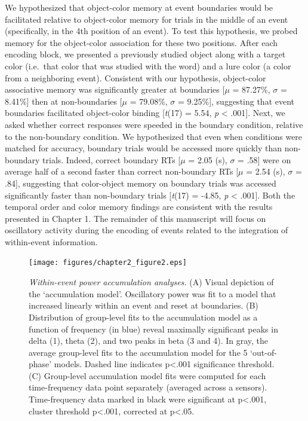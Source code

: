 We hypothesized that object-color memory at event boundaries would be
facilitated relative to object-color memory for trials in the middle of
an event (specifically, in the 4th position of an event). To test this
hypothesis, we probed memory for the object-color association for these
two positions. After each encoding block, we presented a previously
studied object along with a target color (i.e.~that color that was
studied with the word) and a lure color (a color from a neighboring
event). Consistent with our hypothesis, object-color associative memory
was significantly greater at boundaries {[}\(\mu\) = 87.27\%, \(\sigma\)
= 8.41\%{]} then at non-boundaries {[}\(\mu\) = 79.08\%, \(\sigma\) =
9.25\%{]}, suggesting that event boundaries facilitated object-color
binding {[}\emph{t}(17) = 5.54, \emph{p} \textless{} .001{]}. Next, we
asked whether correct responses were speeded in the boundary condition,
relative to the non-boundary condition. We hypothesized that even when
conditions were matched for accuracy, boundary trials would be accessed
more quickly than non-boundary trials. Indeed, correct boundary RTs
{[}\(\mu\) = 2.05 (s), \(\sigma\) = .58{]} were on average half of a
second faster than correct non-boundary RTs {[}\(\mu\) = 2.54 (s),
\(\sigma\) = .84{]}, suggesting that color-object memory on boundary
trials was accessed significantly faster than non-boundary trials
{[}\emph{t}(17) = -4.85, \emph{p} \textless{} .001{]}. Both the temporal
order and color memory findings are consistent with the results
presented in Chapter 1. The remainder of this manuscript will focus on
oscillatory activity during the encoding of events related to the
integration of within-event information.

\begin{figure}
  \centering
  \texttt{[image: figures/chapter2\_figure2.eps]}
  \caption[Within-event power accumulation analyses]{\textit{Within-event power accumulation analyses.} (A) Visual depiction of the ‘accumulation model’.  Oscillatory power was fit to a model that increased linearly within an event and reset at boundaries. (B) Distribution of group-level fits to the accumulation model as a function of frequency (in blue) reveal maximally significant peaks in delta (1), theta (2), and two peaks in beta (3 and 4).  In gray, the average group-level fits to the accumulation model for the 5 ‘out-of-phase’ models.  Dashed line indicates p<.001 significance threshold.  (C) Group-level accumulation model fits were computed for each time-frequency data point separately (averaged across a sensors).  Time-frequency data marked in black were significant at p<.001, cluster threshold p<.001, corrected at p<.05.}
  \label{chapter2_figure2}
\end{figure}

